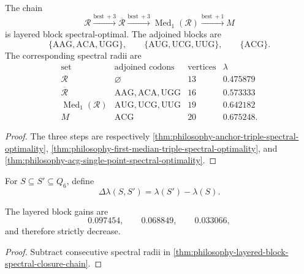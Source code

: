 \begin{theorem}
\label{thm:philosophy-layered-block-spectral-closure-chain}
The chain
$$
  \mathcal{R}
  \xrightarrow{\mathrm{best}\ +3}
  \overline{\mathcal{R}}
  \xrightarrow{\mathrm{best}\ +3}
  \operatorname{Med}_{1}(\mathcal{R})
  \xrightarrow{\mathrm{best}\ +1}
  M
$$
is layered block spectral-optimal. The adjoined blocks are
$$
  \{\mathrm{AAG},\mathrm{ACA},\mathrm{UGG}\},
  \qquad
  \{\mathrm{AUG},\mathrm{UCG},\mathrm{UUG}\},
  \qquad
  \{\mathrm{ACG}\}.
$$
The corresponding spectral radii are
$$
\begin{array}{c|l|r|r}
  \text{set} & \text{adjoined codons} & \text{vertices} & \lambda\\
  \hline
  \mathcal{R} & \varnothing & 13 & 0.475879\\
  \overline{\mathcal{R}}
    & \mathrm{AAG},\mathrm{ACA},\mathrm{UGG} & 16 & 0.573333\\
  \operatorname{Med}_{1}(\mathcal{R})
    & \mathrm{AUG},\mathrm{UCG},\mathrm{UUG} & 19 & 0.642182\\
  M
    & \mathrm{ACG} & 20 & 0.675248.
\end{array}
$$
\end{theorem}
\begin{proof}
The three steps are respectively
\autoref{thm:philosophy-anchor-triple-spectral-optimality},
\autoref{thm:philosophy-first-median-triple-spectral-optimality}, and
\autoref{thm:philosophy-acg-single-point-spectral-optimality}.
\end{proof}

\begin{definition}
\label{def:philosophy-spectral-gain}
For $S\subseteq S'\subseteq Q_{6}$, define
$$
  \Delta\lambda(S,S')=\lambda(S')-\lambda(S).
$$
\end{definition}

\begin{corollary}
\label{cor:philosophy-diminishing-block-gain}
The layered block gains are
$$
  0.097454,\qquad
  0.068849,\qquad
  0.033066,
$$
and therefore strictly decrease.
\end{corollary}
\begin{proof}
Subtract consecutive spectral radii in
\autoref{thm:philosophy-layered-block-spectral-closure-chain}.
\end{proof}

